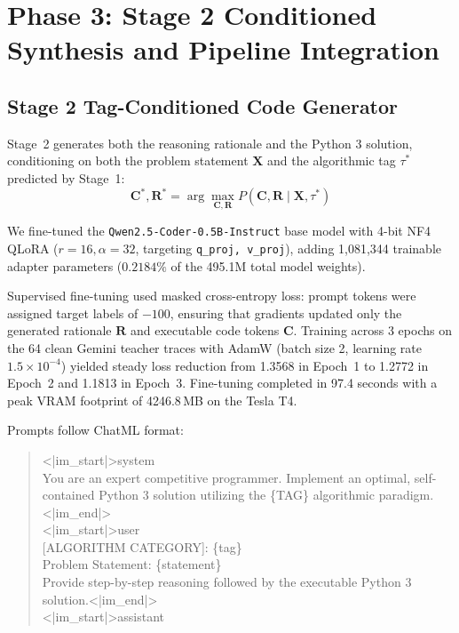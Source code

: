 \documentclass[journal]{IEEEtran}
\begin{document}
\section{Phase 3: Stage 2 Conditioned Synthesis and Pipeline Integration}
\subsection{Stage 2 Tag-Conditioned Code Generator}
Stage~2 generates both the reasoning rationale and the Python 3 solution, conditioning on both the problem statement $\mathbf{X}$ and the algorithmic tag $\tau^*$ predicted by Stage~1:
\begin{equation}
\mathbf{C}^*, \mathbf{R}^* = \arg\max_{\mathbf{C}, \mathbf{R}} P(\mathbf{C}, \mathbf{R} \mid \mathbf{X}, \tau^*)
\end{equation}

We fine-tuned the \texttt{Qwen2.5-Coder-0.5B-Instruct} base model with 4-bit NF4 QLoRA ($r=16, \alpha=32$, targeting \texttt{q\_proj, v\_proj}), adding 1,081,344 trainable adapter parameters ($0.2184\%$ of the 495.1M total model weights).

Supervised fine-tuning used masked cross-entropy loss: prompt tokens were assigned target labels of $-100$, ensuring that gradients updated only the generated rationale $\mathbf{R}$ and executable code tokens $\mathbf{C}$. Training across 3 epochs on the 64 clean Gemini teacher traces with AdamW (batch size 2, learning rate $1.5 \times 10^{-4}$) yielded steady loss reduction from 1.3568 in Epoch~1 to 1.2772 in Epoch~2 and 1.1813 in Epoch~3. Fine-tuning completed in 97.4 seconds with a peak VRAM footprint of 4246.8\,MB on the Tesla T4.

Prompts follow ChatML format:
\begin{quote}
\raggedright\small\ttfamily
<|im\_start|>system\\
You are an expert competitive programmer. Implement an optimal, self-contained Python 3 solution utilizing the \{TAG\} algorithmic paradigm.<|im\_end|>\\
<|im\_start|>user\\
{[ALGORITHM CATEGORY]}: \{tag\}\\
Problem Statement: \{statement\}\\
Provide step-by-step reasoning followed by the executable Python 3 solution.<|im\_end|>\\
<|im\_start|>assistant
\end{quote}
\end{document}

